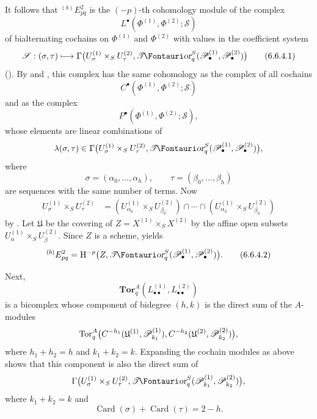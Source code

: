 \begin{env}[6.6.4]
It follows that ${}^{(b)}E_{pq}^2$ is the $(-p)$-th cohomology
module of the complex
\[
  L^\bullet(\Phi^{(1)},\Phi^{(2)};\mathcal S)
\]
of bialternating cochains on $\Phi^{(1)}$ and $\Phi^{(2)}$ with
values in the coefficient system
\[
  \mathcal S:(\sigma,\tau)\longmapsto
  \Gamma\bigl(
    U_\sigma^{(1)}\times_SU_\tau^{(2)},
    \shTor_q^S(\sh P_\bullet^{(1)},\sh P_\bullet^{(2)})
  \bigr)
  \tag{6.6.4.1}\label{III.6.6.4.1}
\]
().  By  and
, this complex has the same cohomology as the
complex of all cochains
\[
  C^\bullet(\Phi^{(1)},\Phi^{(2)};\mathcal S)
\]
and as the complex
\[
  P^\bullet(\Phi^{(1)},\Phi^{(2)};\mathcal S),
\]
whose elements are linear combinations of
\[
  \lambda(\sigma,\tau)\in
  \Gamma\bigl(
    U_\sigma^{(1)}\times_SU_\tau^{(2)},
    \shTor_q^S(\sh P_\bullet^{(1)},\sh P_\bullet^{(2)})
  \bigr),
\]
where
\[
  \sigma=(\alpha_0,\ldots,\alpha_h),
  \qquad
  \tau=(\beta_0,\ldots,\beta_h)
\]
are sequences with the same number of terms.  Now
\[
\begin{split}
  U_\sigma^{(1)}\times_SU_\tau^{(2)}
  &=
  (U_{\alpha_0}^{(1)}\times_SU_{\beta_0}^{(2)})
  \cap\cdots\cap
  (U_{\alpha_h}^{(1)}\times_SU_{\beta_h}^{(2)})
\end{split}
\]
by .  Let $\mathfrak U$ be the covering of
$Z=X^{(1)}\times_SX^{(2)}$ by the affine open subsets
$U_\alpha^{(1)}\times_SU_\beta^{(2)}$.  Since $Z$ is a scheme,
 yields
\[
  {}^{(b)}E_{pq}^2
  =
  \HH^{-p}
  \bigl(
    Z,\shTor_q^S
    (\sh P_\bullet^{(1)},\sh P_\bullet^{(2)})
  \bigr).
  \tag{6.6.4.2}\label{III.6.6.4.2}
\]

Next,
\[
  \mathbf{Tor}_q^A
  (L_{\bullet\bullet}^{(1)},L_{\bullet\bullet}^{(2)})
\]
is a bicomplex whose component of bidegree $(h,k)$ is the direct
sum of the $A$-modules
\[
  \operatorname{Tor}_q^A
  \bigl(
    C^{-h_1}(\mathfrak U^{(1)},\mathscr{P}_{k_1}^{(1)}),
    C^{-h_2}(\mathfrak U^{(2)},\mathscr{P}_{k_2}^{(2)})
  \bigr),
\]
where $h_1+h_2=h$ and $k_1+k_2=k$.  Expanding the cochain
modules as above shows that this component is also the direct
sum of
\[
  \Gamma\bigl(
    U_\sigma^{(1)}\times_SU_\tau^{(2)},
    \shTor_q^S(\sh P_{k_1}^{(1)},\sh P_{k_2}^{(2)})
  \bigr),
\]
where $k_1+k_2=k$ and
\[
  \operatorname{Card}(\sigma)
  +\operatorname{Card}(\tau)=2-h.
\]


\end{env}
